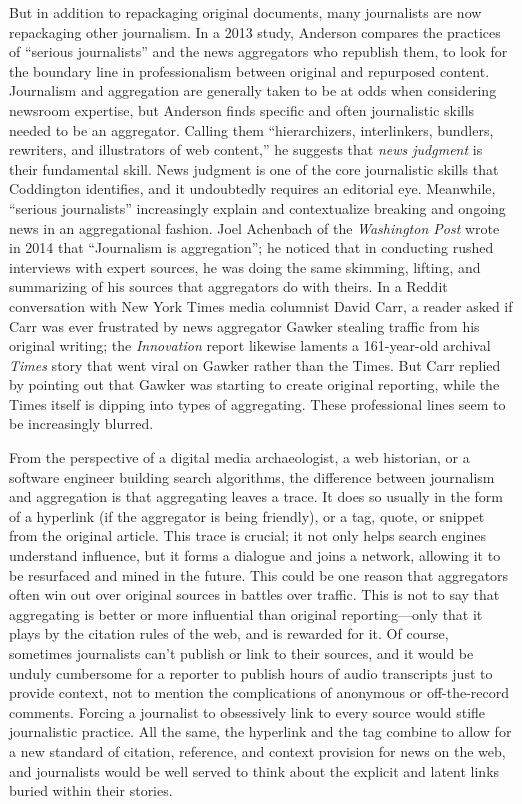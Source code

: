 But in addition to repackaging original documents, many journalists are now repackaging other journalism. In a 2013 study, Anderson compares the practices of ``serious journalists'' and the news aggregators who republish them, to look for the boundary line in professionalism between original and repurposed content. Journalism and aggregation are generally taken to be at odds when considering newsroom expertise, but Anderson finds specific and often journalistic skills needed to be an aggregator. Calling them ``hierarchizers, interlinkers, bundlers, rewriters, and illustrators of web content,'' he suggests that \emph{news judgment} is their fundamental skill.\autocite{anderson_what_2013} News judgment is one of the core journalistic skills that Coddington identifies, and it undoubtedly requires an editorial eye. Meanwhile, ``serious journalists'' increasingly explain and contextualize breaking and ongoing news in an aggregational fashion. Joel Achenbach of the \emph{Washington Post} wrote in 2014 that ``Journalism is aggregation''; he noticed that in conducting rushed interviews with expert sources, he was doing the same skimming, lifting, and summarizing of his sources that aggregators do with theirs.\autocite{achenbach_journalism_2014} In a Reddit conversation with New York Times media columnist David Carr, a reader asked if Carr was ever frustrated by news aggregator Gawker stealing traffic from his original writing; the \emph{Innovation} report likewise laments a 161-year-old archival \emph{Times} story that went viral on Gawker rather than the Times.\autocite[28]{_innovation_2014} But Carr replied by pointing out that Gawker was starting to create original reporting, while the Times itself is dipping into types of aggregating.\autocite{carr_iama_????} These professional lines seem to be increasingly blurred.

From the perspective of a digital media archaeologist, a web historian, or a software engineer building search algorithms, the difference between journalism and aggregation is that aggregating leaves a trace. It does so usually in the form of a hyperlink (if the aggregator is being friendly), or a tag, quote, or snippet from the original article. This trace is crucial; it not only helps search engines understand influence, but it forms a dialogue and joins a network, allowing it to be resurfaced and mined in the future. This could be one reason that aggregators often win out over original sources in battles over traffic. This is not to say that aggregating is better or more influential than original reporting---only that it plays by the citation rules of the web, and is rewarded for it. Of course, sometimes journalists can't publish or link to their sources, and it would be unduly cumbersome for a reporter to publish hours of audio transcripts just to provide context, not to mention the complications of anonymous or off-the-record comments. Forcing a journalist to obsessively link to every source would stifle journalistic practice. All the same, the hyperlink and the tag combine to allow for a new standard of citation, reference, and context provision for news on the web, and journalists would be well served to think about the explicit and latent links buried within their stories.

